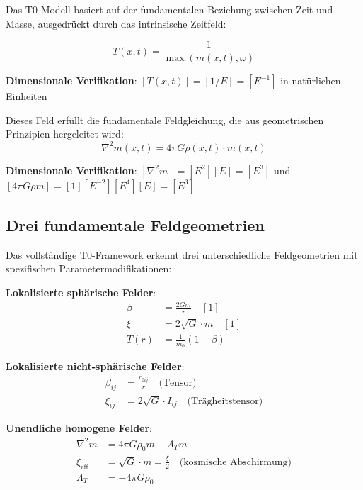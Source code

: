 \documentclass[12pt,a4paper]{article}
\newcommand{\Tfield}{T(x,t)}
\newcommand{\mfield}{m(x,t)}
\theoremstyle{definition}
\theoremstyle{remark}
\begin{document}
	Das T0-Modell basiert auf der fundamentalen Beziehung zwischen Zeit und Masse, ausgedrückt durch das intrinsische Zeitfeld:
	
	\begin{equation}
		\boxed{\Tfield = \frac{1}{\max(\mfield, \omega)}}
		\label{eq:intrinsisches_zeitfeld}
	\end{equation}
	
	\textbf{Dimensionale Verifikation}: $[\Tfield] = [1/E] = [E^{-1}]$ in natürlichen Einheiten \checkmark
	
	Dieses Feld erfüllt die fundamentale Feldgleichung, die aus geometrischen Prinzipien hergeleitet wird:
	\begin{equation}
		\nabla^2 \mfield = 4\pi G \rho(x,t) \cdot \mfield
		\label{eq:feldgleichung}
	\end{equation}
	
	\textbf{Dimensionale Verifikation}: $[\nabla^2 m] = [E^2][E] = [E^3]$ und $[4\pi G \rho m] = [1][E^{-2}][E^4][E] = [E^3]$ \checkmark
	
	\subsection{Drei fundamentale Feldgeometrien}
	\label{subsec:drei_geometrien}
	
	Das vollständige T0-Framework erkennt drei unterschiedliche Feldgeometrien mit spezifischen Parametermodifikationen:
	
	\begin{tcolorbox}[colback=blue!5!white,colframe=blue!75!black,title=T0-Modell-Parameterrahmen]
		\textbf{Lokalisierte sphärische Felder}:
		\begin{align}
			\beta &= \frac{2Gm}{r} \quad [1] \\
			\xi &= 2\sqrt{G} \cdot m \quad [1] \\
			T(r) &= \frac{1}{m_0}(1 - \beta)
		\end{align}
		
		\textbf{Lokalisierte nicht-sphärische Felder}:
		\begin{align}
			\beta_{ij} &= \frac{r_{0ij}}{r} \quad \text{(Tensor)} \\
			\xi_{ij} &= 2\sqrt{G} \cdot I_{ij} \quad \text{(Trägheitstensor)}
		\end{align}
		
		\textbf{Unendliche homogene Felder}:
		\begin{align}
			\nabla^2 m &= 4\pi G \rho_0 m + \Lambda_T m \\
			\xi_{\text{eff}} &= \sqrt{G} \cdot m = \frac{\xi}{2} \quad \text{(kosmische Abschirmung)} \\
			\Lambda_T &= -4\pi G \rho_0
		\end{align}
	\end{tcolorbox}
	
\end{document}
